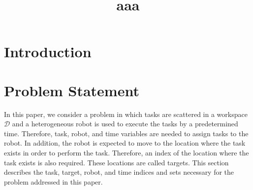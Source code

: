 \documentclass[]{interact}
\theoremstyle{plain}%
\theoremstyle{definition}
\theoremstyle{remark}
\begin{document}

\title{aaa}

\author{
}

\maketitle

\begin{abstract}

\end{abstract}

\begin{keywords}
\end{keywords}


\section{Introduction}

\section{Problem Statement}\label{sec:Problem Statement}

In this paper, we consider a problem in which tasks are scattered in a workspace $\mathcal{D}$ and a heterogeneous robot is used to execute the tasks by a predetermined time.
Therefore, task, robot, and time variables are needed to assign tasks to the robot.
In addition, the robot is expected to move to the location where the task exists in order to perform the task. 
Therefore, an index of the location where the task exists is also required. These locations are called targets.
This section describes the task, target, robot, and time indices and sets necessary for the problem addressed in this paper.
\end{document}
